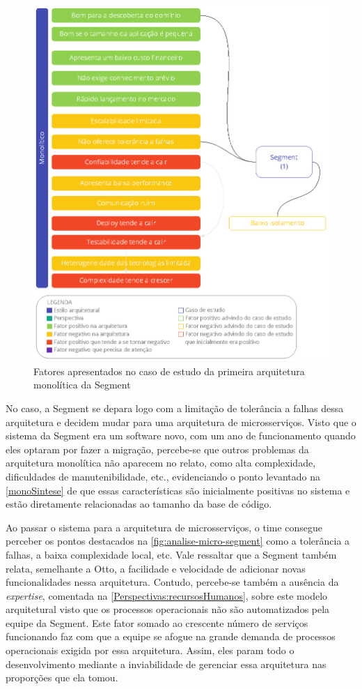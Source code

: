 \begin{figure}[h]
  \centering
  \includegraphics[keepaspectratio=true,scale=1]{figuras/analise-mono-segment-1.eps}
  \caption{Fatores apresentados no caso de estudo da primeira arquitetura monolítica da Segment\label{fig:analise-mono-segment-1}}
\end{figure}

No caso, a Segment se depara logo com a limitação de tolerância a falhas dessa arquitetura e decidem
mudar para uma arquitetura de microsserviços. Visto que o sistema da Segment era um software novo,
com um ano de funcionamento quando eles optaram por fazer a migração, percebe-se que outros problemas
da arquitetura monolítica não aparecem no relato, como alta complexidade, dificuldades de
manutenibilidade, etc., evidenciando o ponto levantado na \autoref{monoSintese} de que essas
características são inicialmente positivas no sistema e estão diretamente relacionadas ao tamanho da
base de código.

Ao passar o sistema para a arquitetura de microsserviços, o time consegue perceber os pontos
destacados na \autoref{fig:analise-micro-segment} como a tolerância a falhas, a baixa complexidade
local, etc. Vale ressaltar que a Segment também relata, semelhante a Otto, a facilidade e velocidade
de adicionar novas funcionalidades nessa arquitetura. Contudo, percebe-se também a ausência da
\textit{expertise},
comentada na \autoref{Perspectivas:recursosHumanos}, sobre este modelo arquitetural visto que os processos
operacionais não são automatizados pela equipe da Segment. Este fator somado ao crescente número de
serviços funcionando faz com que a equipe se afogue na grande demanda de processos operacionais
exigida por essa arquitetura. Assim, eles param todo o desenvolvimento mediante a inviabilidade de
gerenciar essa arquitetura nas proporções que ela tomou.

